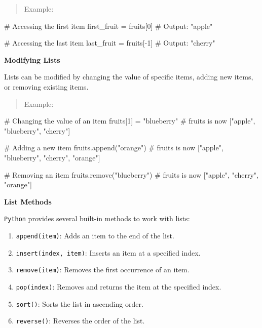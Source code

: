 \documentclass[
  letterpaper,
  DIV=11,
  numbers=noendperiod]{scrreprt}
\newenvironment{Shaded}{\begin{snugshade}}{\end{snugshade}}
\newcommand{\CommentTok}[1]{\textcolor[rgb]{0.37,0.37,0.37}{#1}}
\newcommand{\DecValTok}[1]{\textcolor[rgb]{0.68,0.00,0.00}{#1}}
\newcommand{\NormalTok}[1]{\textcolor[rgb]{0.00,0.23,0.31}{#1}}
\newcommand{\OperatorTok}[1]{\textcolor[rgb]{0.37,0.37,0.37}{#1}}
\newcommand{\StringTok}[1]{\textcolor[rgb]{0.13,0.47,0.30}{#1}}
\providecommand{\tightlist}{%
  \setlength{\itemsep}{0pt}\setlength{\parskip}{0pt}}\usepackage{longtable,booktabs,array}
\theoremstyle{plain}
\theoremstyle{definition}
\theoremstyle{remark}
\begin{document}
\begin{quote}
Example:
\end{quote}

\begin{Shaded}
\begin{Highlighting}[]

\CommentTok{\# Accessing the first item}
\NormalTok{first\_fruit }\OperatorTok{=}\NormalTok{ fruits[}\DecValTok{0}\NormalTok{]  }\CommentTok{\# Output: "apple"}

\CommentTok{\# Accessing the last item}
\NormalTok{last\_fruit }\OperatorTok{=}\NormalTok{ fruits[}\OperatorTok{{-}}\DecValTok{1}\NormalTok{]  }\CommentTok{\# Output: "cherry"}
\end{Highlighting}
\end{Shaded}

\textbf{Modifying Lists}

Lists can be modified by changing the value of specific items, adding
new items, or removing existing items.

\begin{quote}
Example:
\end{quote}

\begin{Shaded}
\begin{Highlighting}[]
\CommentTok{\# Changing the value of an item}
\NormalTok{fruits[}\DecValTok{1}\NormalTok{] }\OperatorTok{=} \StringTok{"blueberry"}  \CommentTok{\# fruits is now ["apple", "blueberry", "cherry"]}

\CommentTok{\# Adding a new item}
\NormalTok{fruits.append(}\StringTok{"orange"}\NormalTok{)  }\CommentTok{\# fruits is now ["apple", "blueberry", "cherry", "orange"]}

\CommentTok{\# Removing an item}
\NormalTok{fruits.remove(}\StringTok{"blueberry"}\NormalTok{)  }\CommentTok{\# fruits is now ["apple", "cherry", "orange"]}
\end{Highlighting}
\end{Shaded}

\textbf{List Methods}

\texttt{Python} provides several built-in methods to work with lists:

\begin{enumerate}
\def\labelenumi{\arabic{enumi}.}
\tightlist
\item
  \texttt{append(item)}: Adds an item to the end of the list.
\item
  \texttt{insert(index,\ item)}: Inserts an item at a specified index.
\item
  \texttt{remove(item)}: Removes the first occurrence of an item.
\item
  \texttt{pop(index)}: Removes and returns the item at the specified
  index.
\item
  \texttt{sort()}: Sorts the list in ascending order.
\item
  \texttt{reverse()}: Reverses the order of the list.
\end{enumerate}
\end{document}
